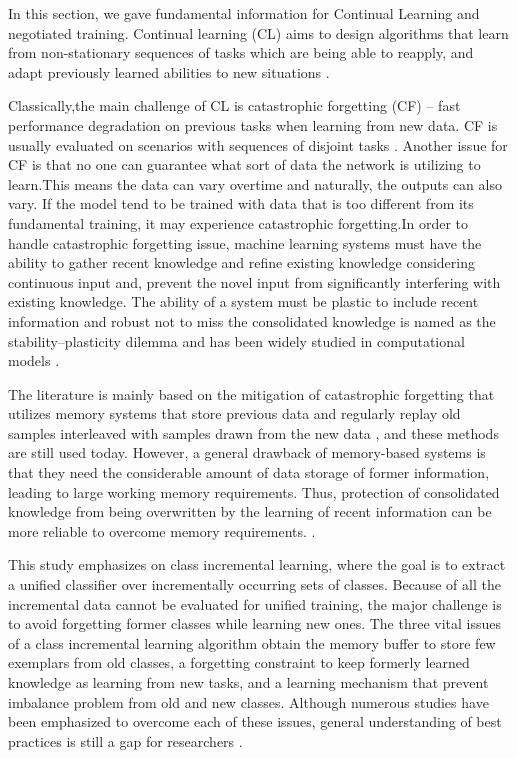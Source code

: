 \documentclass{article}
\begin{document}
In this section, we gave fundamental information for Continual Learning and negotiated training. Continual learning (CL) aims to design algorithms that learn from non-stationary sequences of tasks which are being able to reapply, and adapt previously learned abilities to new situations \cite{khetarpal2022towards}.  

Classically,the main challenge of CL is catastrophic forgetting (CF) – fast performance degradation on previous tasks when learning from new data. CF is usually evaluated on scenarios with sequences of disjoint tasks \cite{lesort2022challenging}. Another issue for CF is that no one can guarantee  what sort of data the network is utilizing to learn.This means the data can vary overtime and naturally, the outputs can also vary. If the model tend to be trained with data that is too different from its fundamental training, it may experience catastrophic forgetting.In order to handle catastrophic forgetting issue, machine learning systems must have the ability to gather recent knowledge and refine existing knowledge considering continuous input and, prevent the novel input from significantly interfering with existing knowledge. The ability of a system must be plastic to include recent  information and robust not to miss the consolidated knowledge is named as the stability–plasticity dilemma and has been widely studied in computational models \cite{ditzler2015learning,mermillod2013stability}. 

The literature is mainly based on the mitigation of catastrophic forgetting that utilizes memory systems that store previous data and regularly replay old samples interleaved with samples drawn from the new data \cite{robins1995catastrophic}, and these methods are still used today. However, a general drawback of memory-based systems is that they need the considerable amount of data storage of former information, leading to large working memory requirements. Thus,  protection of consolidated knowledge
from being overwritten by the learning of recent information can be more reliable to overcome memory requirements. \cite{parisi2019continual}. 

This study emphasizes on class incremental learning, where the goal is to extract a unified classifier over incrementally occurring sets of classes. Because of all the incremental data cannot be evaluated for unified training, the major challenge is to avoid forgetting former classes while learning new ones. The three vital issues of a class incremental learning algorithm
obtain the memory buffer to store few exemplars from old
classes, a forgetting constraint to keep formerly learned knowledge
as learning from new tasks, and a learning mechanism that prevent imbalance problem from old and new classes. Although numerous studies have been emphasized to overcome each of these issues, general understanding of best practices is still a gap for researchers \cite{mittal2021essentials}. 
\end{document}
